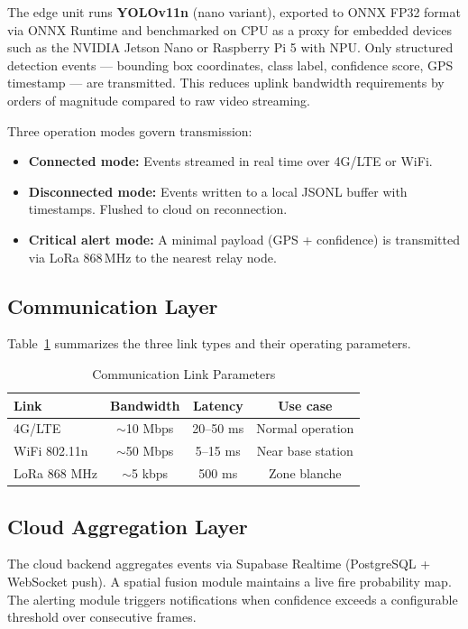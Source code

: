 \documentclass[conference]{IEEEtran}
\begin{document}
The edge unit runs \textbf{YOLOv11n} (nano variant), exported to ONNX
FP32 format via ONNX Runtime and benchmarked on CPU as a proxy for
embedded devices such as the NVIDIA Jetson Nano or Raspberry Pi 5 with NPU. Only structured detection events — bounding
box coordinates, class label, confidence score, GPS timestamp — are
transmitted. This reduces uplink bandwidth requirements by orders of
magnitude compared to raw video streaming.

Three operation modes govern transmission:
\begin{itemize}
  \item \textbf{Connected mode:} Events streamed in real time over
        4G/LTE or WiFi.
  \item \textbf{Disconnected mode:} Events written to a local JSONL
        buffer with timestamps. Flushed to cloud on reconnection.
  \item \textbf{Critical alert mode:} A minimal payload (GPS +
        confidence) is transmitted via LoRa 868\,MHz to the nearest
        relay node.
\end{itemize}

\subsection{Communication Layer}

Table~\ref{tab:links} summarizes the three link types and their
operating parameters.

\begin{table}[h]
\caption{Communication Link Parameters}
\label{tab:links}
\centering
\begin{tabular}{lccc}
\toprule
\textbf{Link} & \textbf{Bandwidth} & \textbf{Latency} & \textbf{Use case} \\
\midrule
4G/LTE        & $\sim$10 Mbps & 20--50 ms  & Normal operation \\
WiFi 802.11n  & $\sim$50 Mbps & 5--15 ms   & Near base station \\
LoRa 868 MHz  & $\sim$5 kbps  & 500 ms     & Zone blanche \\
\bottomrule
\end{tabular}
\end{table}

\subsection{Cloud Aggregation Layer}

The cloud backend aggregates events via Supabase Realtime
(PostgreSQL + WebSocket push). A spatial fusion module maintains a
live fire probability map. The alerting module triggers notifications
when confidence exceeds a configurable threshold over consecutive
frames.
\end{document}
